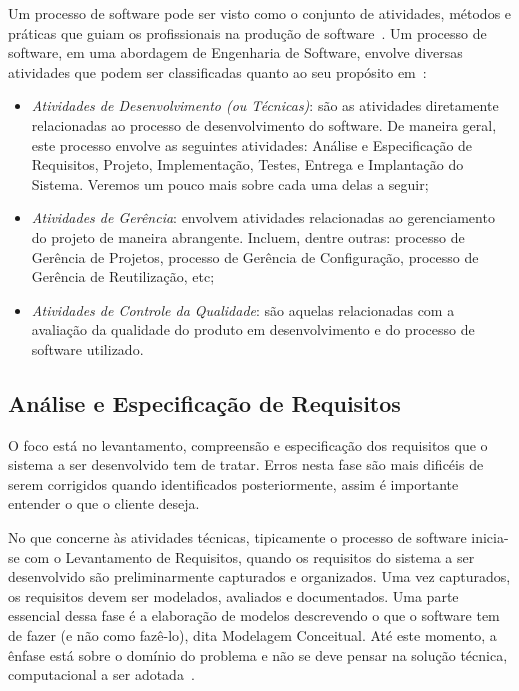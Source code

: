 Um processo de software pode ser visto como o conjunto de atividades, métodos e práticas que guiam os profissionais na produção de software~\cite{falboEngSoft}. Um processo de software, em uma abordagem de Engenharia de Software, envolve diversas atividades que podem ser classificadas quanto ao seu propósito em~\cite{falboEngReq}:

\begin{itemize}
	\item \textit{Atividades de Desenvolvimento (ou Técnicas)}: são as atividades diretamente relacionadas ao processo de desenvolvimento do software. De maneira geral, este processo envolve as seguintes atividades: Análise e Especificação de Requisitos, Projeto, Implementação, Testes, Entrega e Implantação do Sistema. Veremos um pouco mais sobre cada uma delas a seguir;
	\item \textit{Atividades de Gerência}: envolvem atividades relacionadas ao gerenciamento do projeto de maneira abrangente. Incluem, dentre outras: processo de Gerência de Projetos, processo de Gerência de Configuração, processo de Gerência de Reutilização, etc;
	\item \textit{Atividades de Controle da Qualidade}: são aquelas relacionadas com a avaliação da qualidade do produto em desenvolvimento e do processo de software utilizado. 
\end{itemize}




\subsection{Análise e Especificação de Requisitos}
\label{sec-referencial-engenharia-software-atividade-desenvolvimento-analise-especificacao-requisisto}

O foco está no levantamento, compreensão e especificação dos requisitos que o sistema a ser desenvolvido tem de tratar.  Erros nesta fase são mais dificéis de serem corrigidos quando identificados posteriormente, assim é importante entender o que o cliente deseja.%

No que concerne às atividades técnicas, tipicamente o processo de software inicia-se com o Levantamento de Requisitos, quando os requisitos do sistema a ser desenvolvido são preliminarmente capturados e organizados. Uma vez capturados, os requisitos devem ser modelados, avaliados e documentados. Uma parte essencial dessa fase é a elaboração de modelos descrevendo o que o software tem de fazer (e não como fazê-lo), dita Modelagem Conceitual. Até este momento, a ênfase está sobre o domínio do problema e não se deve pensar na solução técnica, computacional a ser adotada~\cite{falboEngReq}.

